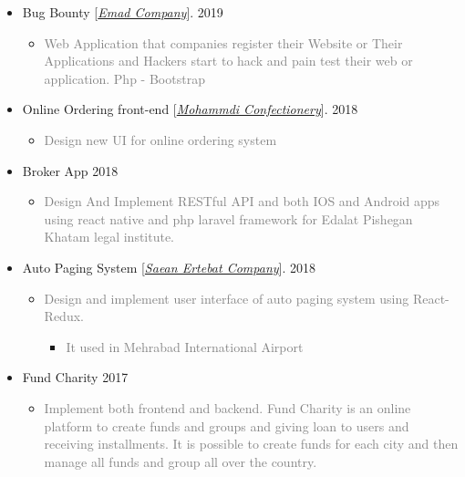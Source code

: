 \documentclass[10pt,a4paper,sans]{moderncv} %
\begin{document}
\begin{itemize}
		\item Bug Bounty [\href{http://emad24.ir/}{\emph{Emad Company}}]. \hfill 2019
		\begin{itemize}
			\item \textcolor{gray} {Web Application that companies register their Website or Their Applications and Hackers start to hack and pain test their web or application. Php - Bootstrap}
		\end{itemize}

		\item Online Ordering front-end [\href{http://#/}{\emph{Mohammdi Confectionery}}]. \hfill 2018
		\begin{itemize}
			\item \textcolor{gray} { Design new UI for online ordering system }
		\end{itemize}

		\item Broker App \hfill 2018
		\begin{itemize}
			\item \textcolor{gray} { Design And Implement RESTful API and both IOS and Android apps using react native and php laravel framework for Edalat Pishegan Khatam legal institute. }
		\end{itemize}

		\item Auto Paging System [\href{http://www.senatelecom.com/}{\emph{Saean Ertebat Company}}]. \hfill 2018
		\begin{itemize}
			\item \textcolor{gray} {Design and implement user interface of auto paging system using React-Redux.}
			\begin{itemize}
				\item \textcolor{gray} {It used in Mehrabad International Airport}
			\end{itemize}
		\end{itemize}

		\item Fund Charity \hfill 2017
		\begin{itemize}
			\item \textcolor{gray} {  Implement both frontend and backend. Fund Charity is an online platform to create funds and groups and giving loan to users and receiving installments. It is possible to create funds for each city and then manage all funds and group all over the country. }
		\end{itemize}


\end{itemize}
\end{document}

